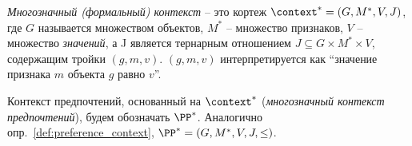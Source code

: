 	\begin{definition}
		\label{def:multivalued_context}
		\emph{Многозначный (формальный) контекст} – это кортеж $\context^* = (G, M^*, V, J)$, где $G$ называется множеством объектов, $M^*$ – множество признаков, $V$ – множество \emph{значений}, а J является тернарным отношением ${J \subseteq G \times M^* \times V}$, содержащим тройки $(g,m,v)$. $(g,m,v)$ интерпретируется как ``значение признака $m$ объекта $g$ равно $v$''. 
	\end{definition}
	
	Контекст предпочтений, основанный на $\context^*$ (\emph{многозначный контекст предпочтений}), будем обозначать $\PP^*$. Аналогично опр.~\ref{def:preference_context}, $\PP^* = (G, M^*, V, J, \leq)$.
	
